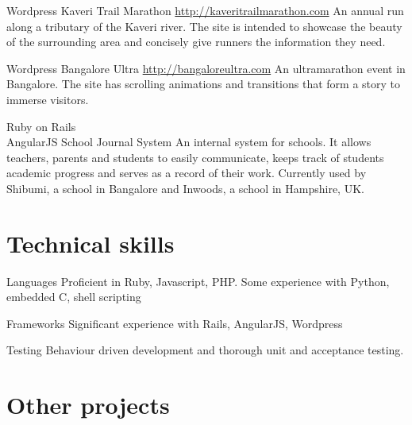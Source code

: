 \documentclass[11pt,a4paper,sans]{moderncv}        %
\begin{document}
\vspace{8pt}

\cventry
{\textcolor{light}{Wordpress}}
{Kaveri Trail Marathon}
{}
{\href{http://kaveritrailmarathon.com}{\textcolor{linkcolour}{http://kaveritrailmarathon.com}}}{}
{An annual run along a tributary of the Kaveri river. The site is intended to showcase the beauty of the surrounding area and concisely give runners the information they need.}

\vspace{8pt}

\cventry
{\textcolor{light}{Wordpress}}
{Bangalore Ultra}
{}
{\href{http://bangaloreultra.com}{\textcolor{linkcolour}{http://bangaloreultra.com}}}{}
{An ultramarathon event in Bangalore. The site has scrolling animations and transitions that form a story to immerse visitors.}

\vspace{8pt}

\cventry
{\textcolor{light}{Ruby on Rails \\AngularJS}}
{School Journal System}
{}
{}{}
{An internal system for schools. It allows teachers, parents and students to easily communicate, keeps track of students academic progress and serves as a record of their work. Currently used by Shibumi, a school in Bangalore and Inwoods, a school in Hampshire, UK.}

\vspace{8pt}

\section{Technical skills}

\vspace{6pt}

\cvline
{\textcolor{light}{Languages}}
{Proficient in Ruby, Javascript, PHP. Some experience with Python, embedded C, shell scripting}

\vspace{6pt}

\cvline
{\textcolor{light}{Frameworks}}
{Significant experience with Rails, AngularJS, Wordpress}

\vspace{6pt}

\cvline
{\textcolor{light}{Testing}}
{Behaviour driven development and thorough unit and acceptance testing.}

\vspace{6pt}

\section{Other projects}
\end{document}
